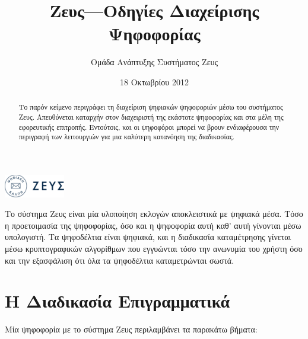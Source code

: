 \documentclass{tufte-handout}
\title{Ζευς---Οδηγίες Διαχείρισης Ψηφοφορίας}
\author[Ομάδα Ανάπτυξης Συστήματος Ζευς]{Ομάδα Ανάπτυξης Συστήματος Ζευς}
\date{18 Οκτωβρίου 2012}
\begin{document}
\maketitle%

\begin{marginfigure}[-5cm]
  \includegraphics[height=1cm]{logo-positive}
\end{marginfigure}


\begin{abstract}
  \noindent Το παρόν κείμενο περιγράφει τη διαχείριση ψηφιακών
  ψηφοφοριών μέσω του συστήματος Ζευς. Απευθύνεται καταρχήν στον
  διαχειριστή της εκάστοτε ψηφοφορίας και στα μέλη της εφορευτικής
  επιτροπής. Εντούτοις, και οι ψηφοφόροι μπορεί να βρουν ενδιαφέρουσα
  την περιγραφή των λειτουργιών για μια καλύτερη κατανόηση της
  διαδικασίας.
\end{abstract}

\noindent Το σύστημα Ζευς είναι μία υλοποίηση εκλογών αποκλειστικά με
ψηφιακά μέσα. Τόσο η προετοιμασία της ψηφοφορίας, όσο και η ψηφοφορία
αυτή καθ' αυτή γίνονται μέσω υπολογιστή. Τα ψηφοδέλτια είναι ψηφιακά,
και η διαδικασία καταμέτρησης γίνεται μέσω κρυπτογραφικών αλγορίθμων
που εγγυώνται τόσο την ανωνυμία του χρήστη όσο και την εξασφάλιση ότι
όλα τα ψηφοδέλτια καταμετρώνται σωστά.

\section{Η Διαδικασία Επιγραμματικά}

Μία ψηφοφορία με το σύστημα Ζευς περιλαμβάνει τα παρακάτω βήματα:
\end{document}

